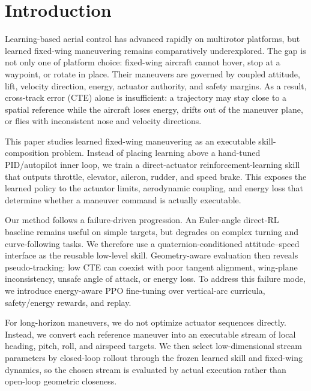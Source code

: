 \documentclass{article}
\begin{document}


\section{Introduction}

Learning-based aerial control has advanced rapidly on multirotor platforms, but learned fixed-wing maneuvering remains comparatively underexplored. The gap is not only one of platform choice: fixed-wing aircraft cannot hover, stop at a waypoint, or rotate in place. Their maneuvers are governed by coupled attitude, lift, velocity direction, energy, actuator authority, and safety margins. As a result, cross-track error (CTE) alone is insufficient: a trajectory may stay close to a spatial reference while the aircraft loses energy, drifts out of the maneuver plane, or flies with inconsistent nose and velocity directions.

This paper studies learned fixed-wing maneuvering as an executable skill-composition problem. Instead of placing learning above a hand-tuned PID/autopilot inner loop, we train a direct-actuator reinforcement-learning skill that outputs throttle, elevator, aileron, rudder, and speed brake. This exposes the learned policy to the actuator limits, aerodynamic coupling, and energy loss that determine whether a maneuver command is actually executable.

Our method follows a failure-driven progression. An Euler-angle direct-RL baseline remains useful on simple targets, but degrades on complex turning and curve-following tasks. We therefore use a quaternion-conditioned attitude--speed interface as the reusable low-level skill. Geometry-aware evaluation then reveals pseudo-tracking: low CTE can coexist with poor tangent alignment, wing-plane inconsistency, unsafe angle of attack, or energy loss. To address this failure mode, we introduce energy-aware PPO fine-tuning over vertical-arc curricula, safety/energy rewards, and replay.

For long-horizon maneuvers, we do not optimize actuator sequences directly. Instead, we convert each reference maneuver into an executable stream of local heading, pitch, roll, and airspeed targets. We then select low-dimensional stream parameters by closed-loop rollout through the frozen learned skill and fixed-wing dynamics, so the chosen stream is evaluated by actual execution rather than open-loop geometric closeness.
\end{document}
